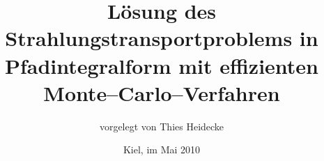 \documentclass[
	12pt,
	a4paper,
	pagesize=auto,
	DIV=10,
	parskip=half,
	titlepage,
	twoside,
	listof=totoc,
	bibliography=totocnumbered,
	final%
]{scrbook}
\begin{document}
\frontmatter
	\titlehead{Christian--Albrechts--Universität zu Kiel\\Institut für Theoretische Physik und Astrophysik}
	\subject{Diplomarbeit}
	\title{Lösung des Strahlungstransportproblems in Pfadintegralform mit effizienten Monte--Carlo--Verfahren}
	\author{vorgelegt von Thies Heidecke}%
	\date{Kiel, im Mai 2010}
	\publishers{betreut durch Prof. Dr. Sebastian Wolf}
	\maketitle

	\tableofcontents	%
	
\mainmatter
	
	
	
	
	
	
	
	
	
\backmatter
\end{document}
